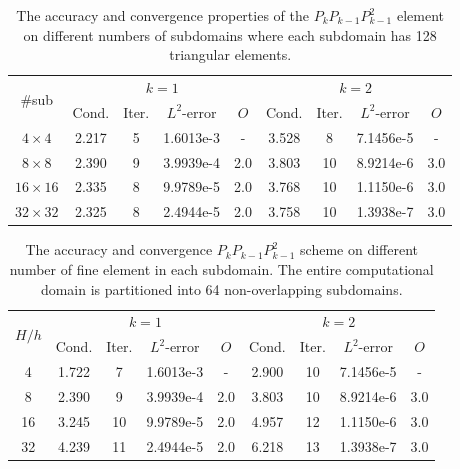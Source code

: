 \vspace{5mm}
\begin{table}[H]
	\setlength{\tabcolsep}{2pt} {
		\vspace{-5pt}
		\begin{center}
			\begin{tabular}{c|cccc|cccc}
				\hline
				\multirow{2}{*}{\#sub} &\multicolumn{4}{c|}{$k=1$} &\multicolumn{4}{c}{$k=2$}\\ 
				& Cond.   & Iter. &$L^2$-error & $ O $ & Cond.   & Iter. &$L^2$-error &$ O $ \\
				\hline
				$4\times 4$     &2.217 &5 &1.6013e-3 &-  &3.528 & 8  &7.1456e-5 & - \\
				$8\times 8$     &2.390 &9 &3.9939e-4 & 2.0 &3.803 &10 &8.9214e-6 & 3.0\\
				$16\times 16$ &2.335 &8 &9.9789e-5 & 2.0 &3.768 &10 &1.1150e-6 & 3.0\\
				$32\times 32$ &2.325 &8 &2.4944e-5 & 2.0 &3.758 &10 &1.3938e-7 & 3.0\\
				\hline
			\end{tabular}
		\end{center} }
		\caption{The accuracy and convergence properties of the $P_{k}P_{k-1}P_{k-1}^2$ element on different numbers of subdomains where each subdomain has 128 triangular elements.}
		\label{Tab:case1_PkPk-1Pk-1Row1}
	\end{table}
	
	\vspace{5mm}
	\begin{table}[H]
		\setlength{\tabcolsep}{2pt} {
			\vspace{-5pt}
			\begin{center}
				\begin{tabular}{c|cccc|cccc}
					\hline
					\multirow{2}{*}{$ H/h $} &\multicolumn{4}{c|}{$k=1$}  &\multicolumn{4}{c}{$k=2$}\\ 
					& Cond.   & Iter. &$L^2$-error & $ O $ & Cond.   & Iter. &$L^2$-error &$ O $ \\
					\hline
					4   &1.722 &7   &1.6013e-3 & - &2.900 &10 &7.1456e-5 & - \\
					8   &2.390 &9   &3.9939e-4& 2.0 &3.803 &10 &8.9214e-6 & 3.0\\
					16 &3.245 &10 &9.9789e-5 & 2.0 &4.957 &12 &1.1150e-6 & 3.0\\
					32 &4.239 &11 &2.4944e-5 & 2.0 &6.218 &13 &1.3938e-7 & 3.0\\
					\hline
				\end{tabular}
			\end{center} }
			\caption{The accuracy and convergence  $P_{k}P_{k-1}P_{k-1}^2$ scheme on different number of fine element in each subdomain. The entire computational domain is partitioned into 64 non-overlapping subdomains.}
			\label{Tab:case1_PkPk-1Pk-1Row2}
		\end{table}
		
